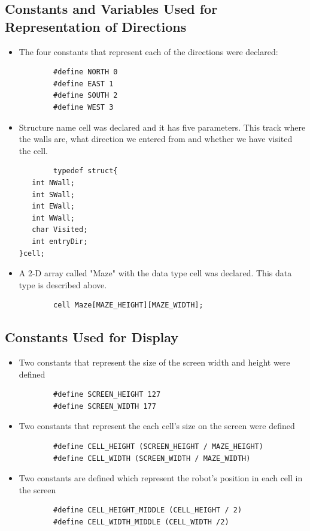 \documentclass[11pt]{article}
\begin{document}

\subsection{Constants and Variables Used for Representation of Directions}
\begin{itemize}
\item The four constants that represent each of the directions were declared:
	\begin{verbatim}
		#define NORTH 0
		#define EAST 1
		#define SOUTH 2
		#define WEST 3
	\end{verbatim}
\item Structure name cell was declared and it has five parameters. This track where the walls are, what direction we entered from and whether we have visited the cell.
	\begin{verbatim}
		typedef struct{
   int NWall; 
   int SWall; 
   int EWall; 
   int WWall; 
   char Visited;
   int entryDir;
}cell;\end{verbatim}
\item A 2-D array called "Maze" with the data type cell was declared. This data type is described above.
	\begin{verbatim}
		cell Maze[MAZE_HEIGHT][MAZE_WIDTH];
	\end{verbatim}
\end{itemize}


\subsection{Constants Used for Display}
\begin{itemize}
\item Two constants that represent the size of the screen width and height were defined
	\begin{verbatim}
		#define SCREEN_HEIGHT 127
		#define SCREEN_WIDTH 177 
	\end{verbatim} 
\item Two constants that represent the each cell's size on the screen were defined
	\begin{verbatim}
		#define CELL_HEIGHT (SCREEN_HEIGHT / MAZE_HEIGHT)
		#define CELL_WIDTH (SCREEN_WIDTH / MAZE_WIDTH)
	\end{verbatim} 
\item Two constants are defined which represent the robot's position in each cell in the screen
	\begin{verbatim}
		#define CELL_HEIGHT_MIDDLE (CELL_HEIGHT / 2)
		#define CELL_WIDTH_MIDDLE (CELL_WIDTH /2)
	\end{verbatim}
\end{itemize}
\end{document}
